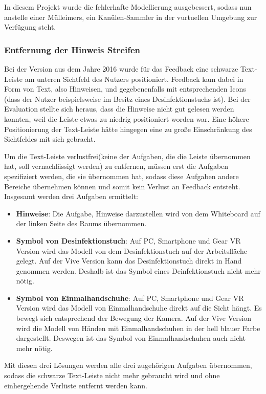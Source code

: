 In diesem Projekt wurde die fehlerhafte Modellierung ausgebessert, sodass nun anstelle einer Mülleimers, ein Kanülen-Sammler in der vurtuellen Umgebung zur Verfügung steht.

   \subsubsection{Entfernung der Hinweis Streifen}
   Bei der Version aus dem Jahre 2016 wurde für das Feedback eine schwarze Text-Leiste am unteren Sichtfeld des Nutzers positioniert. Feedback kam dabei in Form von Text, also Hinweisen, und gegebenenfalls mit entsprechenden Icons (dass der Nutzer beispielsweise im Besitz eines Desinfektionstuchs ist). Bei der Evaluation stellte sich heraus, dass die Hinweise nicht gut gelesen werden konnten, weil die Leiste etwas zu niedrig positioniert worden war. Eine höhere Positionierung der Text-Leiste hätte hingegen eine zu große Einschränkung des Sichtfeldes mit sich gebracht.
   
   Um die Text-Leiste \glqq verlustfrei\grqq (keine der Aufgaben, die die Leiste übernommen hat, soll vernachlässigt werden) zu entfernen, müssen erst die Aufgaben spezifiziert werden, die sie übernommen hat, sodass diese Aufgaben andere Bereiche übernehmen können und somit kein Verlust an Feedback entsteht. Insgesamt werden drei Aufgaben ermittelt:
   
   \begin{itemize}
       \item \textbf{Hinweise}: Die Aufgabe, Hinweise darzustellen wird von dem Whiteboard auf der linken Seite des Raums übernommen.
       \item \textbf{Symbol von Desinfektionstuch}: Auf PC, Smartphone und Gear VR Version wird das Modell von dem Desinfektionstuch auf der Arbeitsfläche gelegt. Auf der Vive Version kann das Desinfektionstuch direkt in Hand genommen werden. Deshalb ist das Symbol eines Deinfektionstuch nicht mehr nötig.
       \item \textbf{Symbol von Einmalhandschuhe}: Auf PC, Smartphone und Gear VR Version wird das Modell von Einmalhandschuhe direkt auf die Sicht hängt. Es bewegt sich entsprechend der Bewegung der Kamera. Auf der Vive Version wird die Modell von Händen mit Einmalhandschuhen in der hell blauer Farbe dargestellt. Deswegen ist das Symbol von Einmalhandschuhen auch nicht mehr nötig. 
   \end{itemize}
   
   Mit diesen drei Lösungen werden alle drei zugehörigen Aufgaben übernommen, sodass die schwarze Text-Leiste nicht mehr gebraucht wird und ohne einhergehende Verlüste entfernt werden kann.
   
